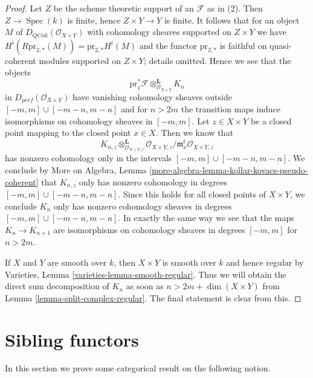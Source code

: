 \documentclass{stacks-project}
\theoremstyle{plain}
\theoremstyle{definition}
\theoremstyle{remark}
\numberwithin{equation}{subsection}
\def\Spec{\mathop{\mathrm{Spec}}}
\def\QCoh{\mathit{QCoh}}
\begin{document}
\begin{proof}
Let $Z$ be the scheme theoretic support of an $\mathcal{F}$ as in (2).
Then $Z \to \Spec(k)$ is finite, hence $Z \times Y \to Y$ is finite.
It follows that for an object $M$ of $D_\QCoh(\mathcal{O}_{X \times Y})$
with cohomology sheaves supported on $Z \times Y$ we have
$H^i(R\text{pr}_{2, *}(M)) = \text{pr}_{2, *}H^i(M)$ and the functor
$\text{pr}_{2, *}$ is faithful on quasi-coherent modules supported
on $Z \times Y$; details omitted. Hence we see that the objects
$$
\text{pr}_1^*\mathcal{F} \otimes_{\mathcal{O}_{X \times Y}}^\mathbf{L} K_n
$$
in $D_{perf}(\mathcal{O}_{X \times Y})$ have vanishing cohomology sheaves
outside $[-m, m] \cup [-m - n, m - n]$ and for $n > 2m$ the transition maps
induce isomorphisms on cohomology sheaves in $[-m, m]$.
Let $z \in X \times Y$ be a closed point mapping to the closed point
$x \in X$. Then we know that
$$
K_{n, z} \otimes_{\mathcal{O}_{X \times Y, z}}^\mathbf{L}
\mathcal{O}_{X \times Y, z}/\mathfrak m_x^t\mathcal{O}_{X \times Y, z}
$$
has nonzero cohomology only in the intervals
$[-m, m] \cup [-m - n, m - n]$.
We conclude by More on Algebra, Lemma
\ref{more-algebra-lemma-kollar-kovacs-pseudo-coherent}
that $K_{n, z}$ only has nonzero cohomology
in degrees $[-m, m] \cup [-m - n, m - n]$. Since this holds for all
closed points of $X \times Y$, we conclude $K_n$ only has nonzero
cohomology sheaves in degrees $[-m, m] \cup [-m - n, m - n]$.
In exactly the same way we see that the maps $K_n \to K_{n + 1}$
are isomorphisms on cohomology sheaves in degrees $[-m, m]$
for $n > 2m$.

\medskip\noindent
If $X$ and $Y$ are smooth over $k$, then $X \times Y$ is smooth
over $k$ and hence regular by
Varieties, Lemma \ref{varieties-lemma-smooth-regular}.
Thus we will obtain the direct sum decomposition of $K_n$
as soon as $n > 2m + \dim(X \times Y)$ from
Lemma \ref{lemma-split-complex-regular}. The final statement
is clear from this.
\end{proof}





\section{Sibling functors}
\label{section-sibling}

\noindent
In this section we prove some categorical result on the following notion.
\end{document}
